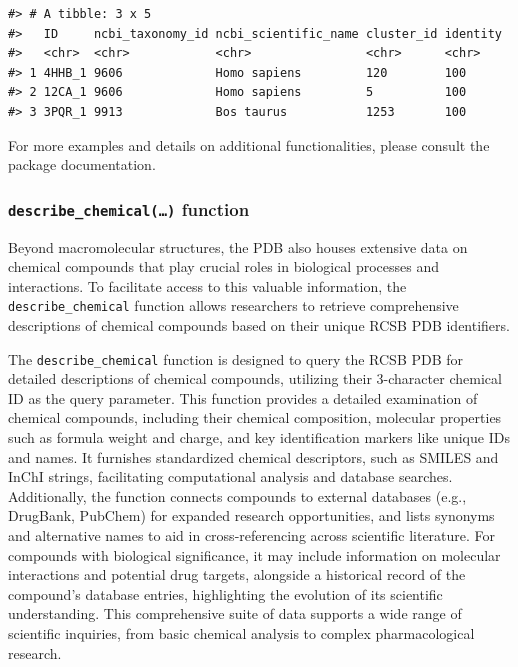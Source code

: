 \begin{verbatim}
#> # A tibble: 3 x 5
#>   ID     ncbi_taxonomy_id ncbi_scientific_name cluster_id identity
#>   <chr>  <chr>            <chr>                <chr>      <chr>   
#> 1 4HHB_1 9606             Homo sapiens         120        100     
#> 2 12CA_1 9606             Homo sapiens         5          100     
#> 3 3PQR_1 9913             Bos taurus           1253       100
\end{verbatim}

For more examples and details on additional functionalities, please consult the package documentation.

\subsubsection{\texorpdfstring{\texttt{describe\_chemical(…)} function}{describe\_chemical(\ldots) function}}\label{describe_chemical-function}

Beyond macromolecular structures, the PDB also houses extensive data on chemical compounds that play crucial roles in biological processes and interactions. To facilitate access to this valuable information, the \texttt{describe\_chemical} function allows researchers to retrieve comprehensive descriptions of chemical compounds based on their unique RCSB PDB identifiers.

The \texttt{describe\_chemical} function is designed to query the RCSB PDB for detailed descriptions of chemical compounds, utilizing their 3-character chemical ID as the query parameter. This function provides a detailed examination of chemical compounds, including their chemical composition, molecular properties such as formula weight and charge, and key identification markers like unique IDs and names. It furnishes standardized chemical descriptors, such as SMILES and InChI strings, facilitating computational analysis and database searches. Additionally, the function connects compounds to external databases (e.g., DrugBank, PubChem) for expanded research opportunities, and lists synonyms and alternative names to aid in cross-referencing across scientific literature. For compounds with biological significance, it may include information on molecular interactions and potential drug targets, alongside a historical record of the compound's database entries, highlighting the evolution of its scientific understanding. This comprehensive suite of data supports a wide range of scientific inquiries, from basic chemical analysis to complex pharmacological research.

